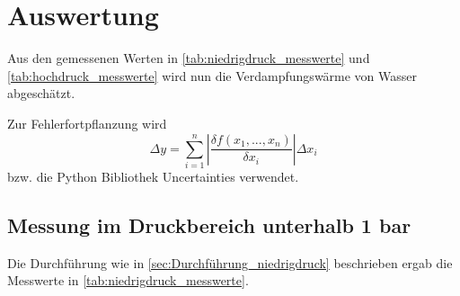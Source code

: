 \section{Auswertung}
\label{sec:Auswertung}



Aus den gemessenen Werten in \autoref{tab:niedrigdruck_messwerte} und \autoref{tab:hochdruck_messwerte} wird nun die Verdampfungswärme von Wasser abgeschätzt.

Zur Fehlerfortpflanzung wird 
\begin{equation}
    \Delta y = \sum_{i=1}^n \left| \frac{\delta f(x_1,...,x_n)}{\delta x_i} \right| \Delta x_i
    \label{eq:fehlerrechnung}
\end{equation}
bzw. die Python Bibliothek Uncertainties verwendet.\cite{uncertainties}

\subsection{Messung im Druckbereich unterhalb 1 bar}
\label{sec:Auswertung_niedrigdruck}

Die Durchführung wie in \autoref{sec:Durchführung_niedrigdruck} beschrieben ergab die Messwerte in \autoref{tab:niedrigdruck_messwerte}.

